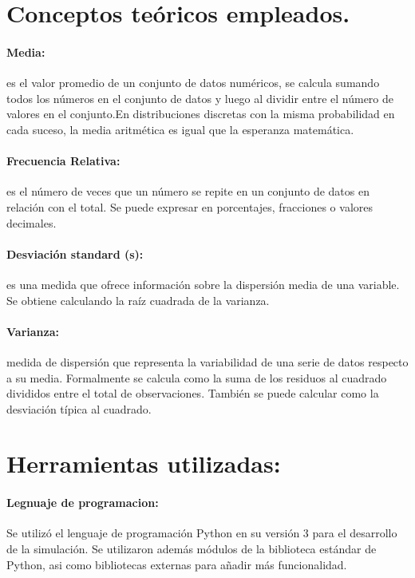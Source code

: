\documentclass{article}
\begin{document}
\section{Conceptos teóricos empleados.}

\paragraph {Media:} es el valor promedio de un conjunto de datos numéricos, se calcula sumando todos los números en el conjunto de datos y luego al dividir entre el número de valores en el conjunto.En distribuciones discretas con la misma probabilidad en cada suceso, la media aritmética es igual que la esperanza matemática.

\paragraph {Frecuencia Relativa:} es el número de veces que un número se repite en un conjunto de datos en relación con el total. Se puede expresar en porcentajes, fracciones o valores decimales.

\paragraph  {Desviación standard (s):} es una medida que ofrece información sobre la dispersión media de una variable. Se obtiene calculando la raíz cuadrada de la varianza.

\paragraph {Varianza:} medida de dispersión que representa la variabilidad de una serie de datos respecto a su media. Formalmente se calcula como la suma de los residuos al cuadrado divididos entre el total de observaciones. También se puede calcular como la desviación típica al cuadrado.

\section{Herramientas utilizadas:}
\paragraph{Legnuaje de programacion:}Se utilizó el lenguaje de programación Python en su versión 3 para el desarrollo de la simulación. Se utilizaron además módulos de la biblioteca estándar de Python, asi como bibliotecas externas para añadir más funcionalidad.
\end{document}
